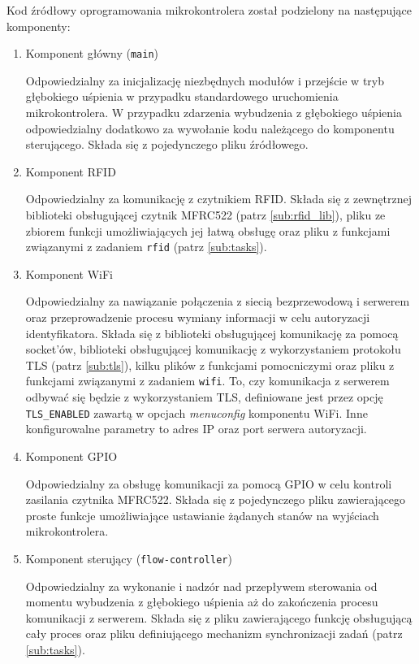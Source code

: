             Kod źródłowy oprogramowania mikrokontrolera został podzielony na następujące komponenty:

            \begin{enumerate}
                \item Komponent główny (\texttt{main})

                    Odpowiedzialny za inicjalizację niezbędnych modułów i przejście w tryb głębokiego uśpienia w przypadku standardowego uruchomienia mikrokontrolera. W przypadku zdarzenia wybudzenia z głębokiego uśpienia odpowiedzialny dodatkowo za wywołanie kodu należącego do komponentu sterującego. Składa się z pojedynczego pliku źródłowego.

                \item Komponent RFID

                    Odpowiedzialny za komunikację z czytnikiem RFID. Składa się z zewnętrznej biblioteki obsługującej czytnik MFRC522 (patrz \ref{sub:rfid_lib}), pliku ze zbiorem funkcji umożliwiających jej łatwą obsługę oraz pliku z funkcjami związanymi z zadaniem \texttt{rfid} (patrz \ref{sub:tasks}).

                \item Komponent WiFi

                    Odpowiedzialny za nawiązanie połączenia z siecią bezprzewodową i serwerem oraz przeprowadzenie procesu wymiany informacji w celu autoryzacji identyfikatora. Składa się z biblioteki obsługującej komunikację za pomocą socket'ów, biblioteki obsługującej komunikację z wykorzystaniem protokołu TLS (patrz \ref{sub:tls}), kilku plików z funkcjami pomocniczymi oraz pliku z funkcjami związanymi z zadaniem \texttt{wifi}. To, czy komunikacja z serwerem odbywać się będzie z wykorzystaniem TLS, definiowane jest przez opcję \texttt{TLS\_ENABLED} zawartą w opcjach \textit{menuconfig} komponentu WiFi. Inne konfigurowalne parametry to adres IP oraz port serwera autoryzacji.

                \item Komponent GPIO

                    Odpowiedzialny za obsługę komunikacji za pomocą GPIO w celu kontroli zasilania czytnika MFRC522. Składa się z pojedynczego pliku zawierającego proste funkcje umożliwiające ustawianie żądanych stanów na wyjściach mikrokontrolera.

                \item Komponent sterujący (\texttt{flow-controller})

                    Odpowiedzialny za wykonanie i nadzór nad przepływem sterowania od momentu wybudzenia z głębokiego uśpienia aż do zakończenia procesu komunikacji z serwerem. Składa się z pliku zawierającego funkcję obsługującą cały proces oraz pliku definiującego mechanizm synchronizacji zadań (patrz \ref{sub:tasks}).

            \end{enumerate}

